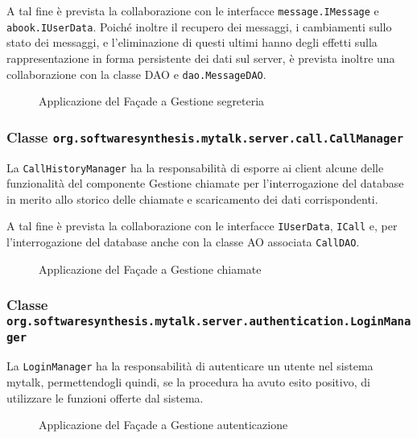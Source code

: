 A tal fine è prevista la collaborazione con le interfacce \texttt{message.IMessage} e \texttt{abook.IUserData}. Poiché inoltre il recupero dei messaggi, i cambiamenti sullo stato dei messaggi, e l'eliminazione di questi ultimi hanno degli effetti sulla rappresentazione in forma persistente dei dati sul server, è prevista inoltre una collaborazione con la classe DAO e \texttt{dao.MessageDAO}.

\begin{figure}[H]
  \centering
  \caption{Applicazione del  Façade a \textsf{Gestione segreteria}}\label{fig:facademessage}
\end{figure}

\subsubsection*{Classe \texttt{org.softwaresynthesis.mytalk.server.call.CallManager}}
La  \texttt{CallHistoryManager} ha la responsabilità di esporre ai client alcune delle funzionalità del componente \textsf{Gestione chiamate} per l'interrogazione del database in merito allo storico delle chiamate e scaricamento dei dati corrispondenti.

A tal fine è prevista la collaborazione con le interfacce \texttt{IUserData}, \texttt{ICall} e, per l'interrogazione del database anche con la classe AO associata \texttt{CallDAO}.

\begin{figure}[H]
  \centering
  \caption{Applicazione del  Façade a \textsf{Gestione chiamate}}\label{fig:facadecall}
\end{figure}

\subsubsection*{Classe \texttt{org.softwaresynthesis.mytalk.server.authentication.LoginManager}}
La  \texttt{LoginManager} ha la responsabilità di autenticare un utente nel sistema mytalk, permettendogli quindi, se la procedura ha avuto esito positivo, di utilizzare le funzioni offerte dal sistema.

\begin{figure}[H]
  \centering
  \caption{Applicazione del  Façade a \textsf{Gestione autenticazione}}\label{fig:facadeauthentication}
\end{figure}

